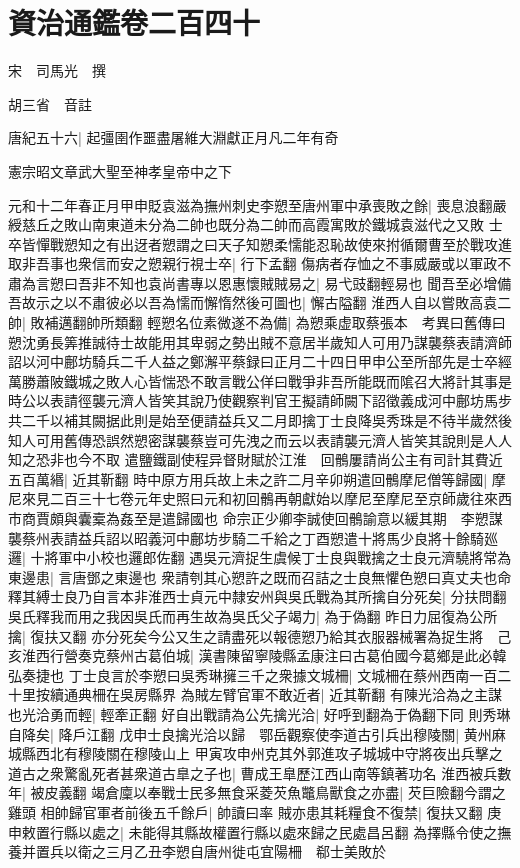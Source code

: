 \section{資治通鑑卷二百四十}
宋　司馬光　撰

胡三省　音註

唐紀五十六|{
	起彊圉作噩盡屠維大淵獻正月凡二年有奇}


憲宗昭文章武大聖至神孝皇帝中之下

元和十二年春正月甲申貶袁滋為撫州刺史李愬至唐州軍中承喪敗之餘|{
	喪息浪翻嚴綬慈丘之敗山南東道未分為二帥也既分為二帥而高霞寓敗於鐵城袁滋代之又敗}
士卒皆憚戰愬知之有出迓者愬謂之曰天子知愬柔懦能忍恥故使來拊循爾曹至於戰攻進取非吾事也衆信而安之愬親行視士卒|{
	行下孟翻}
傷病者存恤之不事威嚴或以軍政不肅為言愬曰吾非不知也袁尚書專以恩惠懷賊賊易之|{
	易弋豉翻輕易也}
聞吾至必增備吾故示之以不肅彼必以吾為懦而懈惰然後可圖也|{
	懈古隘翻}
淮西人自以嘗敗高袁二帥|{
	敗補邁翻帥所類翻}
輕愬名位素微遂不為備|{
	為愬乘虚取蔡張本　考異曰舊傳曰愬沈勇長筭推誠待士故能用其卑弱之勢出賊不意居半歲知人可用乃謀襲蔡表請濟師詔以河中鄜坊騎兵二千人益之鄭澥平蔡録曰正月二十四日甲申公至所部先是士卒經萬勝蕭陂鐵城之敗人心皆惴恐不敢言戰公佯曰戰爭非吾所能既而隂召大將計其事是時公以表請徑襲元濟人皆笑其說乃使觀察判官王擬請師闕下詔徵義成河中鄜坊馬步共二千以補其闕据此則是始至便請益兵又二月即擒丁士良降吳秀珠是不待半歲然後知人可用舊傳恐誤然愬密謀襲蔡豈可先洩之而云以表請襲元濟人皆笑其說則是人人知之恐非也今不取}
遣鹽鐵副使程异督財賦於江淮　回鶻屢請尚公主有司計其費近五百萬緡|{
	近其靳翻}
時中原方用兵故上未之許二月辛卯朔遣回鶻摩尼僧等歸國|{
	摩尼來見二百三十七卷元年史照曰元和初回鶻再朝獻始以摩尼至摩尼至京師歲往來西市商賈頗與囊槖為姦至是遣歸國也}
命宗正少卿李誠使回鶻諭意以緩其期　李愬謀襲蔡州表請益兵詔以昭義河中鄜坊步騎二千給之丁酉愬遣十將馬少良將十餘騎廵邏|{
	十將軍中小校也邏郎佐翻}
遇吳元濟捉生虞候丁士良與戰擒之士良元濟驍將常為東邊患|{
	言唐鄧之東邊也}
衆請刳其心愬許之既而召詰之士良無懼色愬曰真丈夫也命釋其縛士良乃自言本非淮西士貞元中隸安州與吳氏戰為其所擒自分死矣|{
	分扶問翻}
吳氏釋我而用之我因吳氏而再生故為吳氏父子竭力|{
	為于偽翻}
昨日力屈復為公所擒|{
	復扶又翻}
亦分死矣今公又生之請盡死以報德愬乃給其衣服器械署為捉生將　己亥淮西行營奏克蔡州古葛伯城|{
	漢書陳留寧陵縣孟康注曰古葛伯國今葛鄉是此必韓弘奏捷也}
丁士良言於李愬曰吳秀琳擁三千之衆據文城柵|{
	文城柵在蔡州西南一百二十里按續通典柵在吳房縣界}
為賊左臂官軍不敢近者|{
	近其靳翻}
有陳光洽為之主謀也光洽勇而輕|{
	輕牽正翻}
好自出戰請為公先擒光洽|{
	好呼到翻為于偽翻下同}
則秀琳自降矣|{
	降戶江翻}
戊申士良擒光洽以歸　鄂岳觀察使李道古引兵出穆陵關|{
	黄州麻城縣西北有穆陵關在穆陵山上}
甲寅攻申州克其外郭進攻子城城中守將夜出兵擊之道古之衆驚亂死者甚衆道古臯之子也|{
	曹成王臯歷江西山南等鎮著功名}
淮西被兵數年|{
	被皮義翻}
竭倉廩以奉戰士民多無食采菱芡魚鼈鳥獸食之亦盡|{
	芡巨險翻今謂之雞頭}
相帥歸官軍者前後五千餘戶|{
	帥讀曰率}
賊亦患其耗糧食不復禁|{
	復扶又翻}
庚申敕置行縣以處之|{
	未能得其縣故權置行縣以處來歸之民處昌呂翻}
為擇縣令使之撫養并置兵以衛之三月乙丑李愬自唐州徙屯宜陽柵　郗士美敗於

